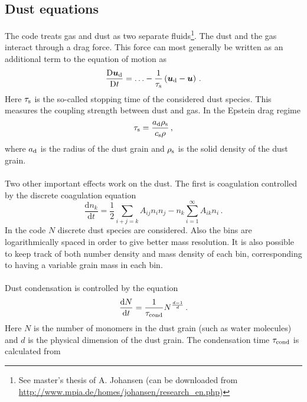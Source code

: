 \documentclass[\mydriver,12pt,twoside,notitlepage,a4paper]{article}
\newcommand{\de}      {\mathrm{d}}
\newcommand{\De}      {\mathrm{D}}
\renewcommand{\vec}[1]{\mbox{\boldmath{$#1$}}}
\begin{document}

\subsection{Dust equations}

The code treats gas and dust as two separate fluids\footnote{See master's
thesis of A. Johansen (can be downloaded from\\
\url{http://www.mpia.de/homes/johansen/research_en.php})}. The dust and the gas
interact through a drag force. This force can most generally be written as an
additional term to the equation of motion as
\begin{equation}
  \frac{\De \vec{u}_{\rm d}}{\De t} = \ldots - \frac{1}{\tau_{\rm s}}
  \left( \vec{u}_{\rm d} - \vec{u} \right)  \, .
\end{equation}
Here $\tau_{\rm s}$ is the so-called stopping time of the considered dust
species. This measures the coupling strength between dust and gas. In the
Epstein drag regime
\begin{equation}
  \tau_{\rm s} = \frac{a_{\rm d} \rho_{\rm s}}{c_{\rm s} \rho} \, ,
\end{equation}
where $a_{\rm d}$ is the radius of the dust grain and $\rho_{\rm s}$ is the
solid density of the dust grain.
\\ \\
Two other important effects work on the dust. The first is coagulation
controlled by the discrete coagulation equation
\begin{equation}
  \frac{\de n_k}{\de t} = \frac{1}{2} \sum_{i+j=k} A_{ij} n_i n_j
  - n_k \sum_{i=1}^\infty A_{ik} n_i \, .
\end{equation}
In the code $N$ discrete dust species are considered. Also the bins are
logarithmically spaced in order to give better mass resolution. It is also
possible to keep track of both number density and mass density of each bin,
corresponding to having a variable grain mass in each bin.
\\ \\
Dust condensation is controlled by the equation
\begin{equation}
  \frac{\de N}{\de t} = \frac{1}{\tau_{\rm cond}} N^{\frac{d-1}{d}} \, .
\end{equation}
Here $N$ is the number of monomers in the dust grain (such as water molecules)
and $d$ is the physical dimension of the dust grain. The condensation time
$\tau_{\rm cond}$ is calculated from
\end{document}
